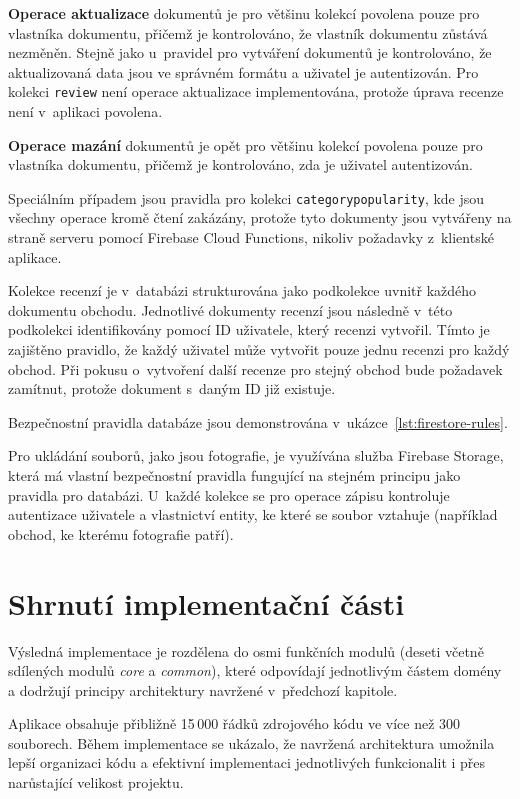 \textbf{Operace aktualizace} dokumentů je pro většinu kolekcí povolena pouze pro vlastníka dokumentu, přičemž je kontrolováno, že vlastník dokumentu zůstává nezměněn.
Stejně jako u~pravidel pro vytváření dokumentů je kontrolováno, že aktualizovaná data jsou ve správném formátu a uživatel je autentizován.
Pro kolekci \texttt{review} není operace aktualizace implementována, protože úprava recenze není v~aplikaci povolena.

\textbf{Operace mazání} dokumentů je opět pro většinu kolekcí povolena pouze pro vlastníka dokumentu, přičemž je kontrolováno, zda je uživatel autentizován.

Speciálním případem jsou pravidla pro kolekci \texttt{category\-popu\-la\-ri\-ty}, kde jsou všechny operace kromě čtení zakázány, protože tyto dokumenty jsou vytvářeny na straně serveru pomocí Firebase Cloud Functions, nikoliv požadavky z~klientské aplikace.

Kolekce recenzí je v~databázi strukturována jako podkolekce uvnitř každého dokumentu obchodu.
Jednotlivé dokumenty recenzí jsou následně v~této podkolekci identifikovány pomocí ID uživatele, který recenzi vytvořil.
Tímto je zajištěno pravidlo, že každý uživatel může vytvořit pouze jednu recenzi pro každý obchod.
Při pokusu o~vytvoření další recenze pro stejný obchod bude požadavek zamítnut, protože dokument s~daným ID již existuje.

Bezpečnostní pravidla databáze jsou demonstrována v~ukázce~\ref{lst:firestore-rules}.

Pro ukládání souborů, jako jsou fotografie, je využívána služba Firebase Storage, která má vlastní bezpečnostní pravidla fungující na stejném principu jako pravidla pro databázi.
U~každé kolekce se pro operace zápisu kontroluje autentizace uživatele a vlastnictví entity, ke které se soubor vztahuje (například obchod, ke kterému fotografie patří).


\section{Shrnutí implementační části}
Výsledná implementace je rozdělena do osmi funkčních modulů (deseti včetně sdílených modulů \textit{core} a \textit{common}), které odpovídají jednotlivým částem domény a dodržují principy architektury navržené v~předchozí kapitole.

Aplikace obsahuje přibližně 15\,000 řádků zdrojového kódu ve více než 300 souborech.
Během implementace se ukázalo, že navržená architektura umožnila lepší organizaci kódu a efektivní implementaci jednotlivých funkcionalit i přes narůstající velikost projektu.

